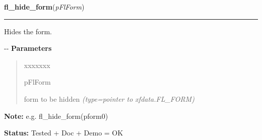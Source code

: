     \label{xformslib:flbasic:fl_hide_form}

    \vspace{0.5ex}

\hspace{.8\funcindent}\begin{boxedminipage}{\funcwidth}

    \raggedright \textbf{fl\_hide\_form}(\textit{pFlForm})

    \vspace{-1.5ex}

    \rule{\textwidth}{0.5\fboxrule}
\setlength{\parskip}{2ex}

Hides the form.

-{}-
\setlength{\parskip}{1ex}
      \textbf{Parameters}
      \vspace{-1ex}

      \begin{quote}
        \begin{Ventry}{xxxxxxx}

          \item[pFlForm]


form to be hidden
            {\it (type=pointer to xfdata.FL\_FORM)}

        \end{Ventry}

      \end{quote}

\textbf{Note:} 
e.g. fl\_hide\_form(pform0)


\textbf{Status:} 
Tested + Doc + Demo = OK


    \end{boxedminipage}

    \label{xformslib:flbasic:fl_free_form}

    \vspace{0.5ex}

